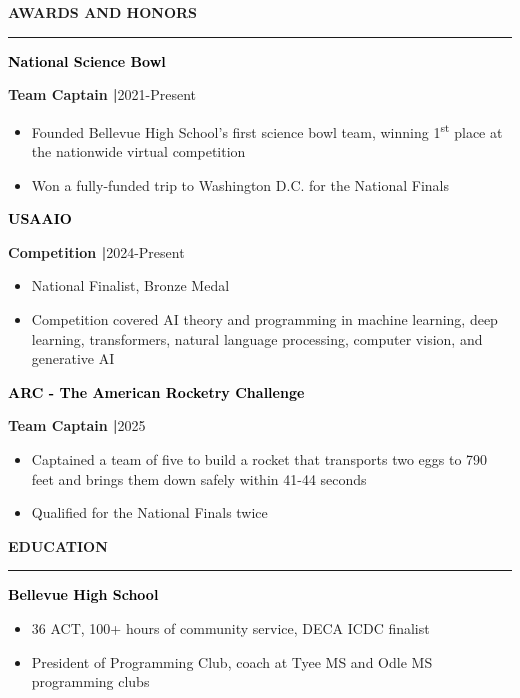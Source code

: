 \documentclass[8pt,a4paper]{altacv}
\newcommand{\resumebodysize}{\fontsize{8pt}{9pt}\selectfont}
\renewcommand{\divider}{\textcolor{body!30}{\hdashrule{\linewidth}{0.6pt}{0.285em}}\vspace{4.096pt}}
\renewcommand{\cvsection}[2][]{%
  \bigskip%
  \vspace{3.686pt}%
  \ifstrequal{#1}{}{}{\marginpar{\vspace*{\dimexpr1pt-\baselineskip}\raggedright}}%
  {\color{heading}\large\bfseries\MakeUppercase{#2}}\\[-1ex]\vspace{1.489pt}%
  {\color{heading}\rule{\linewidth}{2pt}\par}\medskip\vspace{1.179pt}
}
\renewcommand{\cvevent}[4]{%
  {\fontsize{9pt}{9pt}\selectfont\color{black}\hspace*{-0.282pt}#1\par}
  \ifstrequal{#2}{}{}{%
    \vspace{2.144pt}
    {\fontsize{9pt}{9pt}\selectfont\textbf{\color{accent}#2}\hspace{0.5em}\resumebodysize\faCalendar\hspace{0.5em}#3\par}%
  }%
  \vspace{2.145pt}\resumebodysize
}
\begin{document}
\vskip-4.273pt
\cvsection{Awards and Honors}
\vskip0.464pt

\cvevent{\textcolor{black}{\textbf{National Science Bowl}}}{\textnormal{Team Captain |}}{2021-Present}{}
\begin{itemize}
\item Founded Bellevue High School’s first science bowl team, winning 1\textsuperscript{st} place at the nationwide virtual competition
\item Won a fully-funded trip to Washington D.C. for the National Finals
\end{itemize}
\divider

\cvevent{\textcolor{black}{\textbf{USAAIO}}}{\textnormal{Competition |}}{2024-Present}{}
\begin{itemize}
\item National Finalist, Bronze Medal
\item Competition covered AI theory and programming in machine learning, deep learning, transformers, natural language processing, computer vision, and generative AI
\end{itemize}
\divider

\cvevent{\textcolor{black}{\textbf{ARC - The American Rocketry Challenge}}}{\textnormal{Team Captain |}}{2025}{}
\begin{itemize}
\item Captained a team of five to build a rocket that transports two eggs to 790 feet and brings them down safely within 41-44 seconds
\item Qualified for the National Finals twice
\end{itemize}

\vskip-3.343pt
\cvsection{Education}
\vskip-1.479pt

\cvevent{\textcolor{black}{\textbf{Bellevue High School}}}{}{}{}
\begin{itemize}
\item 36 ACT, 100+ hours of community service, DECA ICDC finalist
\item President of Programming Club, coach at Tyee MS and Odle MS programming clubs
\end{itemize}
\end{document}
